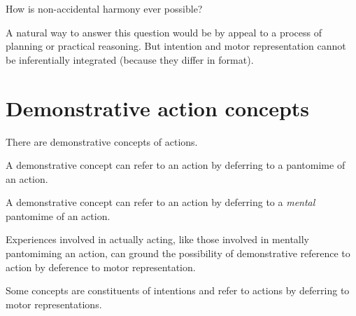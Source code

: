 \documentclass[11pt]{extarticle}
\begin{document}
\begin{multicols}{3}
How is non-accidental harmony ever possible?

A natural way to answer this question would be by appeal to a process of planning or practical reasoning.
But intention and motor representation cannot be inferentially integrated (because they differ in format).  


\section{Demonstrative action concepts}
There are demonstrative concepts of actions.

A demonstrative concept can refer to an action by deferring to a pantomime of an action.

A demonstrative concept can refer to an action by deferring to a \emph{mental} pantomime of an action.

Experiences involved in actually acting, like those involved in mentally pantomiming an action, can ground the possibility of demonstrative reference to action by deference to motor representation.

Some concepts are constituents of intentions and refer to actions by deferring to motor representations.



\footnotesize 


\end{multicols}
\end{document}

